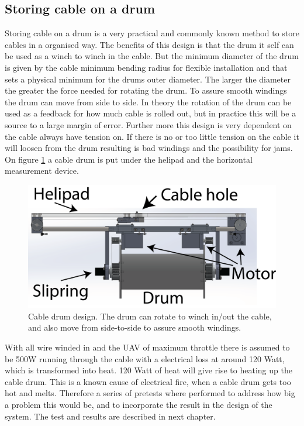 \subsection{Storing cable on a drum}
Storing cable on a drum is a very practical and commonly known method to store cables in a organised way. The benefits of this design is that the drum it self can be used as a winch to winch in the cable. But the minimum diameter of the drum is given by the cable minimum bending radius for flexible installation and that sets a physical minimum for the drums outer diameter. The larger the diameter the greater the force needed for rotating the drum. To assure smooth windings the drum can move from side to side. 
In theory the rotation of the drum can be used as a feedback for how much cable is rolled out, but in practice this will be a source to a large margin of error. Further more this design is very dependent on the cable always have tension on. If there is no or too little tension on the cable it will loosen from the drum resulting is bad windings and the possibility for jams. \\
On figure \ref{fig:cable-drum} a cable drum is put under the helipad and the horizontal measurement device. 

\begin{figure}[H]
\centering
\includegraphics[scale=0.75]{graphics/cad/cable-drum.png}
\caption[Cable drum design]{Cable drum design. The drum can rotate to winch in/out the cable, and also move from side-to-side to assure smooth windings.}
\label{fig:cable-drum}
\end{figure}

\noindent
With all wire winded in and the UAV of maximum throttle there is assumed to be 500W running through the cable with a electrical loss at around 120 Watt, which is transformed into heat. 120 Watt of heat will give rise to heating up the cable drum. This is a known cause of electrical fire, when a cable drum gets too hot and melts. Therefore a series of pretests where performed to address how big a problem this would be, and to incorporate the result in the design of the system. The test and results are described in next chapter.



